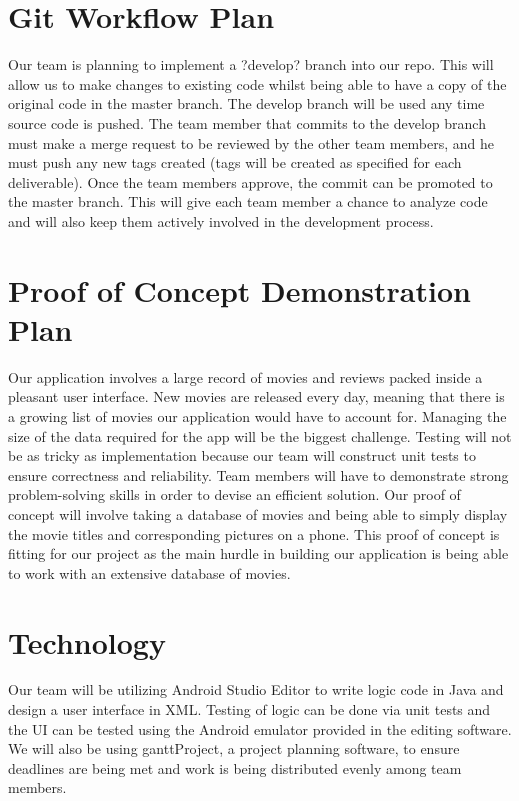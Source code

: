 \documentclass{article}
\begin{document}
\section{Git Workflow Plan}
Our team is planning to implement a ?develop? branch into our repo. This will allow us to make changes to existing code whilst being able to have a copy of the original code in the master branch. The develop branch will be used any time source code is pushed. The team member that commits to the develop branch must make a merge request to be reviewed by the other team members, and he must push any new tags created (tags will be created as specified for each deliverable). Once the team members approve, the commit can be promoted to the master branch. This will give each team member a chance to analyze code and will also keep them actively involved in the development process. 

\section{Proof of Concept Demonstration Plan}
 Our application involves a large record of movies and reviews packed inside a pleasant user interface. New movies are released every day, meaning that there is a growing list of movies our application would have to account for. Managing the size of the data required for the app will be the biggest challenge. Testing will not be as tricky as implementation because our team will construct unit tests to ensure correctness and reliability. Team members will have to demonstrate strong problem-solving skills in order to devise an efficient solution. Our proof of concept will involve taking a database of movies and being able to simply display the movie titles and corresponding pictures on a phone. This proof of concept is fitting for our project as the main hurdle in building our application is being able to work with an extensive database of movies. 


\section{Technology}
Our team will be utilizing Android Studio Editor to write logic code in Java and design a user interface in XML. Testing of logic can be done via unit tests and the UI can be tested using the Android emulator provided in the editing software. We will also be using ganttProject, a project planning software, to ensure deadlines are being met and work is being distributed evenly among team members.
\end{document}
